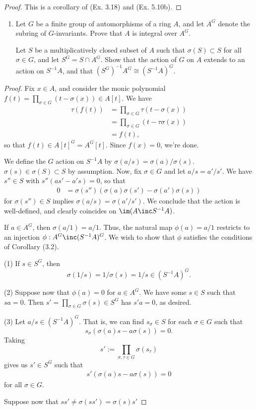 \documentclass[12pt]{amsart}
\begin{document}
\begin{proof}
  This is a corollary of (Ex. 3.18) and (Ex. 5.10b).
\end{proof}

\begin{enumerate}
  \item[5.12] {
      Let $G$ be a finite group of automorphisms of a ring $A$, and let $A^G$ denote the subring of $G$-invariants.
      Prove that $A$ is integral over $A^G$.

      Let $S$ be a multiplicatively closed subset of $A$ such that $\sigma(S)\subset S$ for all $\sigma\in G$, and let $S^G=S\cap A^G$.
      Show that the action of $G$ on $A$ extends to an action on $S^{-1}A$, and that $(S^G)^{-1}A^G\cong (S^{-1}A)^G$.
    }
\end{enumerate}

\begin{proof}
  Fix $x\in A$, and consider the monic polynomial $f(t)=\prod_{\sigma\in G}(t-\sigma(x))\in A[t]$.
  We have
  \begin{align*}
    \tau(f(t))
      &=\prod_{\sigma\in G}\tau(t-\sigma(x)) \\
      &=\prod_{\sigma\in G}(t-\tau\sigma(x)) \\
      &=f(t),
  \end{align*}
  so that $f(t)\in A[t]^G=A^G[t]$.
  Since $f(x)=0$, we're done.

  We define the $G$ action on $S^{-1}A$ by $\sigma(a/s)=\sigma(a)/\sigma(s)$.
  $\sigma(s)\in \sigma(S)\subset S$ by assumption.
  Now, fix $\sigma\in G$ and let $a/s=a'/s'$.
  We have $s''\in S$ with $s''(as'-a's)=0$, so that
  \begin{align*}
    0 &= \sigma(s'')(\sigma(a)\sigma(s')-\sigma(a')\sigma(s))
  \end{align*}
  for $\sigma(s'')\in S$ implies $\sigma(a/s)=\sigma(a'/s')$.
  We conclude that the action is well-defined, and clearly coincides on $\im(A\inc S^{-1}A)$.

  If $a\in A^G$, then $\sigma(a/1)=a/1$.
  Thus, the natural map $\phi(a)=a/1$ restricts to an injection $\phi:A^G\inc (S^{-1}A)^G$.
  We wish to show that $\phi$ satisfies the conditions of Corollary (3.2).

  (1) If $s\in S^G$, then
  \[
    \sigma(1/s)=1/\sigma(s)=1/s\in (S^{-1}A)^G.
  \]

  (2) Suppose now that $\phi(a)=0$ for $a\in A^G$.
  We have some $s\in S$ such that $sa=0$.
  Then $s'=\prod_{\sigma\in G}\sigma(s)\in S^G$ has $s'a=0$, as desired.

  (3) Let $a/s\in (S^{-1}A)^G$.
  That is, we can find $s_\sigma\in S$ for each $\sigma\in G$ such that
  \[
    s_\sigma(\sigma(a)s-a\sigma(s))=0.
  \] 
  Taking
  \[
    s':=\prod_{\sigma,\tau\in G}\sigma(s_\tau)
  \] 
  gives us $s'\in S^G$ such that
  \begin{align*}
    s'(\sigma(a)s-a\sigma(s))=0
  \end{align*}
  for all $\sigma\in G$.

  Suppose now that $ss'\neq \sigma(ss')=\sigma(s)s'$
\end{proof}
\end{document}
